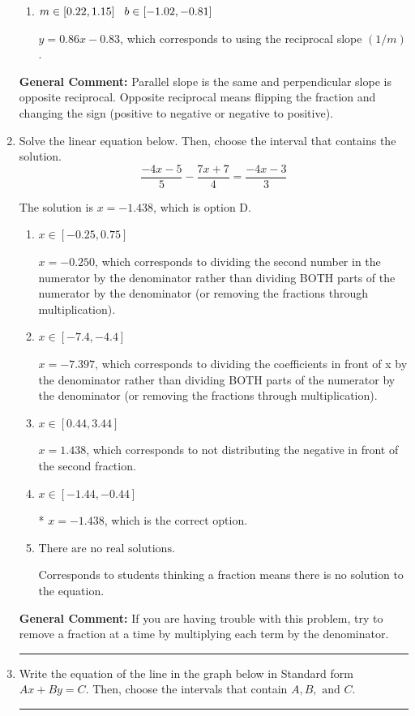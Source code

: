 \documentclass{extbook}[14pt]
\newcommand{\litem}[1]{\item #1

\rule{\textwidth}{0.4pt}}
\begin{document}
\begin{enumerate}
{\begin{enumerate}[label=\Alph*.]
 $y = 1.17x + 0.83$, which corresponds to using the correct slope and getting the negative $y$-intercept.
\item \( m \in [0.22, 1.15] \hspace*{3mm} b \in [-1.02, -0.81] \)

 $y = 0.86x - 0.83$, which corresponds to using the reciprocal slope $(1/m)$.
\end{enumerate}

\textbf{General Comment:} Parallel slope is the same and perpendicular slope is opposite reciprocal. Opposite reciprocal means flipping the fraction and changing the sign (positive to negative or negative to positive).
}
\litem{
Solve the linear equation below. Then, choose the interval that contains the solution.
\[ \frac{-4x -5}{5} - \frac{7x + 7}{4} = \frac{-4x -3}{3} \]

The solution is \( x = -1.438 \), which is option D.\begin{enumerate}[label=\Alph*.]
\item \( x \in [-0.25, 0.75] \)

 $x = -0.250$, which corresponds to dividing the second number in the numerator by the denominator rather than dividing BOTH parts of the numerator by the denominator (or removing the fractions through multiplication).
\item \( x \in [-7.4, -4.4] \)

 $x = -7.397$, which corresponds to dividing the coefficients in front of x by the denominator rather than dividing BOTH parts of the numerator by the denominator (or removing the fractions through multiplication).
\item \( x \in [0.44, 3.44] \)

 $x = 1.438$, which corresponds to not distributing the negative in front of the second fraction.
\item \( x \in [-1.44, -0.44] \)

* $x = -1.438$, which is the correct option.
\item \( \text{There are no real solutions.} \)

Corresponds to students thinking a fraction means there is no solution to the equation.
\end{enumerate}

\textbf{General Comment:} If you are having trouble with this problem, try to remove a fraction at a time by multiplying each term by the denominator.
}
\litem{
Write the equation of the line in the graph below in Standard form $Ax+By=C$. Then, choose the intervals that contain $A, B, \text{ and } C$.

}
\end{enumerate}
\end{document}

